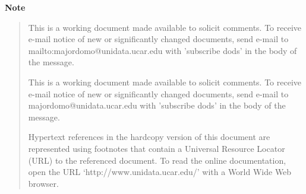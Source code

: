 
%
%

\small

\centerline{{\bf Note}} 

\begin{quotation}

\begin{htmlonly}
  This is a working document made available to solicit comments. To receive
  e-mail notice of new or significantly changed documents, send e-mail
  to 
  {mailto:majordomo@unidata.ucar.edu} with 'subscribe dods' in the
  body of the message.
\end{htmlonly}

\begin{latexonly}
  This is a working document made available to solicit comments. To receive
  e-mail notice of new or significantly changed documents, send e-mail
  to majordomo@unidata.ucar.edu with 'subscribe dods' in the body of
  the message. 

  Hypertext references in the hardcopy version of this document are
  represented using footnotes that contain a Universal Resource Locator (URL)
  to the referenced document.  To read the online documentation, open the URL
  `http://www.unidata.ucar.edu/' with a World Wide Web browser.
\end{latexonly}

\end{quotation}

\normalsize

